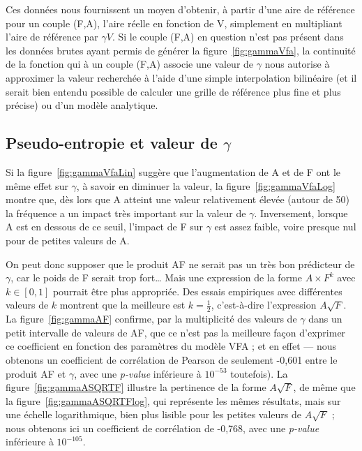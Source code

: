 	Ces données nous fournissent un moyen d'obtenir, à partir d'une aire de référence pour un couple (F,A), l'aire réelle en fonction de V, simplement en multipliant l'aire de référence par $\gamma{}V$. Si le couple (F,A) en question n'est pas présent dans les données brutes ayant permis de générer la figure~\ref{fig:gammaVfa}, la continuité de la fonction qui à un couple (F,A) associe une valeur de $\gamma$ nous autorise à approximer la valeur recherchée à l'aide d'une simple interpolation bilinéaire (et il serait bien entendu possible de calculer une grille de référence plus fine et plus précise) ou d'un modèle analytique.
	
	\subsection{Pseudo-entropie et valeur de \texorpdfstring{$\gamma$}{gamma}}
	Si la figure~\ref{fig:gammaVfaLin} suggère que l'augmentation de A et de F ont le même effet sur $\gamma$, à savoir en diminuer la valeur, la figure~\ref{fig:gammaVfaLog} montre que, dès lors que A atteint une valeur relativement élevée (autour de 50) la fréquence a un impact très important sur la valeur de $\gamma$. Inversement, lorsque A est en dessous de ce seuil, l'impact de F sur $\gamma$ est assez faible, voire presque nul pour de petites valeurs de A.
	
	On peut donc supposer que le produit AF ne serait pas un très bon prédicteur de $\gamma$, car le poids de F serait trop fort\ldots{} Mais une expression de la forme $A\times{}F^{k}$ avec $k \in [0,1]$ pourrait être plus appropriée. Des essais empiriques avec différentes valeurs de $k$ montrent que la meilleure est $k = \frac{1}{2}$, c'est-à-dire l'expression $A\sqrt{F}$. La figure~\ref{fig:gammaAF} confirme, par la multiplicité des valeurs de $\gamma$ dans un petit intervalle de valeurs de AF, que ce n'est pas la meilleure façon d'exprimer ce coefficient en fonction des paramètres du modèle VFA ; et en effet --- nous obtenons un coefficient de corrélation de Pearson de seulement -0,601 entre le produit AF et $\gamma$, avec une \emph{p-value} inférieure à $10^{-53}$ toutefois). La figure~\ref{fig:gammaASQRTF} illustre la pertinence de la forme $A\sqrt{F}$, de même que la figure~\ref{fig:gammaASQRTFlog}, qui représente les mêmes résultats, mais sur une échelle logarithmique, bien plus lisible pour les petites valeurs de $A\sqrt{F}$ ; nous obtenons ici un coefficient de corrélation de -0,768, avec une \emph{p-value} inférieure à $10^{-105}$.
	
